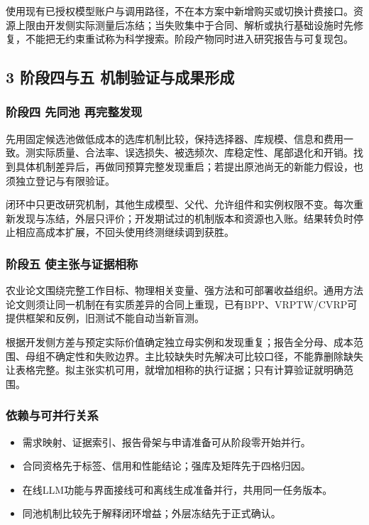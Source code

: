 \documentclass[11pt,a4paper]{article}
\newcommand{\bodytext}[1]{#1\par}
\begin{document}
\bodytext{使用现有已授权模型账户与调用路径，不在本方案中新增购买或切换计费接口。资源上限由开发侧实际测量后冻结；当失败集中于合同、解析或执行基础设施时先修复，不能把无约束重试称为科学搜索。阶段产物同时进入研究报告与可复现包。}
\subsection{3  阶段四与五 机制验证与成果形成}
\subsubsection{阶段四 先同池 再完整发现}
\bodytext{先用固定候选池做低成本的选库机制比较，保持选择器、库规模、信息和费用一致。测实际质量、合法率、误选损失、被选频次、库稳定性、尾部退化和开销。找到具体机制差异后，再做同预算完整发现重启；若提出原池尚无的新能力假设，也须独立登记与有限验证。}
\bodytext{闭环中只更改研究机制，其他生成模型、父代、允许组件和实例权限不变。每次重新发现与冻结，外层只评价；开发期试过的机制版本和资源也入账。结果转负时停止相应高成本扩展，不回头使用终测继续调到获胜。}
\subsubsection{阶段五 使主张与证据相称}
\bodytext{农业论文围绕完整工作目标、物理相关变量、强方法和可部署收益组织。通用方法论文则须让同一机制在有实质差异的合同上重现，已有BPP、VRPTW/\allowbreak{}CVRP可提供框架和反例，旧测试不能自动当新盲测。}
\bodytext{根据开发侧方差与预定实际价值确定独立母实例和发现重复；报告全分母、成本范围、母组不确定性和失败边界。主比较缺失时先解决可比较口径，不能靠删除缺失让表格完整。拟主张实机可用，就增加相称的执行证据；只有计算验证就明确范围。}
\subsubsection{依赖与可并行关系}
\begin{itemize}
\item 需求映射、证据索引、报告骨架与申请准备可从阶段零开始并行。
\item 合同资格先于标签、信用和性能结论；强库及矩阵先于四格归因。
\item 在线LLM功能与界面接线可和离线生成准备并行，共用同一任务版本。
\item 同池机制比较先于解释闭环增益；外层冻结先于正式确认。
\end{itemize}
\end{document}
